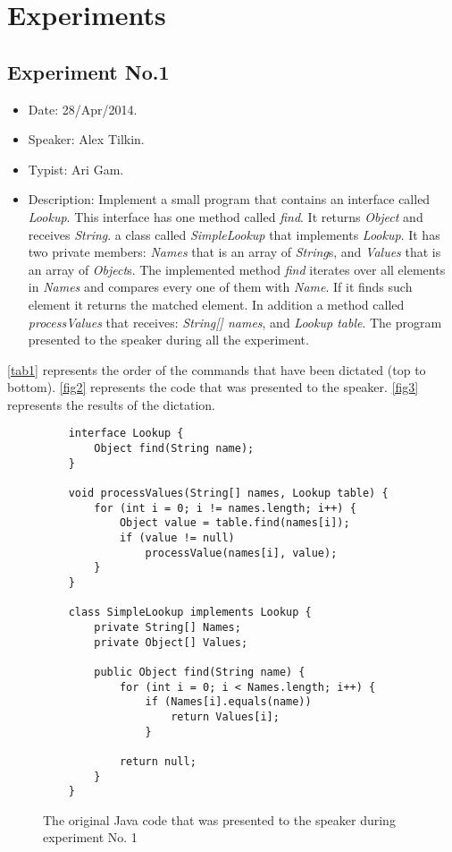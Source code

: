 \section{Experiments} \label{sec: Experiments}
\subsection{Experiment No.1}
\begin{itemize}
	\item Date: 28/Apr/2014.
	\item Speaker: Alex Tilkin.
	\item Typist: Ari Gam.
	\item Description: Implement a small program that contains an interface called \textit{Lookup}. This interface has one method called \textit{find}. It returns \textit{Object} and receives \textit{String}. a class called \textit{SimpleLookup} that implements \textit{Lookup}. It has two private members: \textit{Names} that is an array of \textit{String}s, and \textit{Values} that is an array of \textit{Object}s. The implemented method \textit{find} iterates over all elements in \textit{Names} and compares every one of them with \textit{Name}. If it finds such element it returns the matched element. In addition a method called \textit{processValues} that receives: \textit{String[] names}, and \textit{Lookup table}. The program presented to the speaker during all the experiment.
\end{itemize}
\autoref{tab1} represents the order of the commands that have been dictated (top to bottom). \autoref{fig2} represents the code that was presented to the speaker. \autoref{fig3} represents the results of the dictation.
\begin{figure}[H]
	\begin{lstlisting}
	interface Lookup {
		Object find(String name);
	}
	
	void processValues(String[] names, Lookup table) {
		for (int i = 0; i != names.length; i++) {
			Object value = table.find(names[i]); 
			if (value != null)
				processValue(names[i], value); 
		}
	}
	
	class SimpleLookup implements Lookup {
		private String[] Names;
		private Object[] Values;
		
		public Object find(String name) {
			for (int i = 0; i < Names.length; i++) {
				if (Names[i].equals(name)) 
					return Values[i]; 
				}
				
			return null;
		}
	}
	\end{lstlisting}
	\caption{The original Java code that was presented to the speaker during experiment No. 1}
	\label{fig2}
\end{figure}
